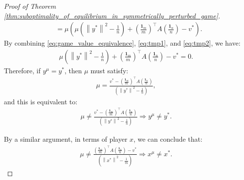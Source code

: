 \documentclass{article}
\newcommand{\bone}{\mathbf{1}}
\theoremstyle{plain}
\begin{document}
\begin{proof}[Proof of Theorem \ref{thm:suboptimality_of_equilibrium_in_symmetrically_perturbed_game}]
\begin{align}
        & = \mu \left(\mu \left(\left\|y^{\ast}\right\|^2 - \frac{1}{n}\right) + \left(\frac{\bone_m}{m}\right)^{\top}A\left(\frac{\bone_n}{n}\right) - v^{\ast}\right).
        \label{eq:tmp2}
    \end{align}
    By combining \eqref{eq:game_value_equivalence}, \eqref{eq:tmp1}, and \eqref{eq:tmp2}, we have:
    \begin{align*}
        \mu \left(\left\|y^{\ast}\right\|^2 - \frac{1}{n}\right) + \left(\frac{\bone_m}{m}\right)^{\top}A\left(\frac{\bone_n}{n}\right) - v^{\ast} = 0.
    \end{align*}
    Therefore, if $y^{\mu} = y^{\ast}$, then $\mu$ must satisfy:
    \begin{align*}
        \mu = \frac{v^{\ast} - \left(\frac{\bone_m}{m}\right)^{\top}A\left(\frac{\bone_n}{n}\right)}{\left(\left\|y^{\ast}\right\|^2 - \frac{1}{n}\right)},
    \end{align*}
    and this is equivalent to:
    \begin{align*}
        \mu \neq \frac{v^{\ast} - \left(\frac{\bone_m}{m}\right)^{\top}A\left(\frac{\bone_n}{n}\right)}{\left(\left\|y^{\ast}\right\|^2 - \frac{1}{n}\right)} \Rightarrow y^{\mu} \neq y^{\ast}.
    \end{align*}

    By a similar argument, in terms of player $x$, we can conclude that:
    \begin{align*}
        \mu \neq \frac{\left(\frac{\bone_m}{m}\right)^{\top}A\left(\frac{\bone_n}{n}\right) - v^{\ast}}{\left(\left\|x^{\ast}\right\|^2 - \frac{1}{m}\right)} \Rightarrow x^{\mu} \neq x^{\ast}.
    \end{align*}
\end{proof}
\end{document}
